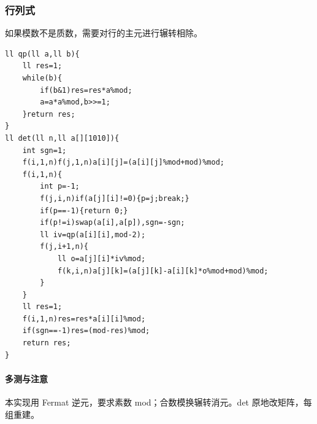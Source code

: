 \subsubsection{行列式}
如果模数不是质数，需要对行的主元进行辗转相除。
\begin{lstlisting}
ll qp(ll a,ll b){
    ll res=1;
    while(b){
        if(b&1)res=res*a%mod;
        a=a*a%mod,b>>=1;
    }return res;
}
ll det(ll n,ll a[][1010]){
    int sgn=1;
    f(i,1,n)f(j,1,n)a[i][j]=(a[i][j]%mod+mod)%mod;
    f(i,1,n){
        int p=-1;
        f(j,i,n)if(a[j][i]!=0){p=j;break;}
        if(p==-1){return 0;}
        if(p!=i)swap(a[i],a[p]),sgn=-sgn;
        ll iv=qp(a[i][i],mod-2);
        f(j,i+1,n){
            ll o=a[j][i]*iv%mod;
            f(k,i,n)a[j][k]=(a[j][k]-a[i][k]*o%mod+mod)%mod;
        }
    }
    ll res=1;
    f(i,1,n)res=res*a[i][i]%mod;
    if(sgn==-1)res=(mod-res)%mod;
    return res;
}
\end{lstlisting}

\paragraph{多测与注意} 本实现用 Fermat 逆元，要求素数 mod；合数模换辗转消元。det 原地改矩阵，每组重建。
